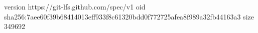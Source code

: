 version https://git-lfs.github.com/spec/v1
oid sha256:7aee60f39b68414013eff933f8c61320bdd0f772725afea8f989a32fb44163a3
size 349692

